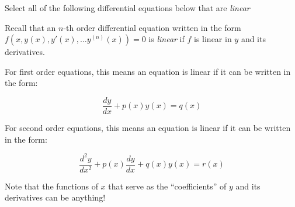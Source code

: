 \documentclass{ximera}
\author{Jim Talamo}
\begin{document}
\begin{exercise}
Select all of the following differential equations below that are \emph{linear}

\begin{selectAll}
\end{selectAll}

\begin{hint}
Recall that an $n$-th order differential equation written in the form $f(x,y(x),y'(x), \ldots y^{(n)}(x))=0$ is \emph{linear} if $f$ is linear in $y$ and its derivatives. 

For first order equations, this means an equation is linear if it can be written in the form:

\[
\frac{dy}{dx}+p(x)y(x)=q(x)
\]


For second order equations, this means an equation is linear if it can be written in the form:

\[
\frac{d^2y}{dx^2}+p(x)\frac{dy}{dx}+q(x)y(x)=r(x)
\]

Note that the functions of $x$ that serve as the ``coefficients'' of $y$ and its derivatives can be anything!
\end{hint}
\end{exercise}
\end{document}
